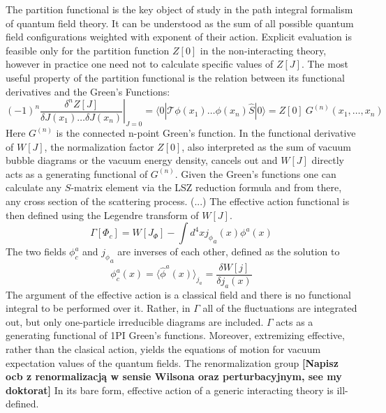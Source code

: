 \documentclass[11pt, a4paper]{article}
\newcommand{\jhk}[1]{{\color{red}#1}}
\newcommand{\jhkbf}[1]{\textbf{\color{red} [#1]}}
\begin{document}
The partition functional is the key object of study in the path integral formalism of quantum field theory.
It can be understood as the sum of all possible quantum field configurations weighted with exponent of their action.
Explicit evaluation is feasible only for the partition function $Z[0]$ in the non-interacting theory, however in practice one need not to calculate specific values of $Z[J]$. The most useful property of the partition functional is the relation between its functional derivatives and the Green's Functions:
\begin{equation}
(-1)^n \left.\frac{\delta^n Z[J]}{\delta J(x_1) \dots \delta J(x_n)}\right|_{J=0} =
\langle 0| \mathcal{T} \phi(x_1) \dots \phi(x_n) \hat{S} |0\rangle = 
    Z[0] \ G^{(n)}(x_1,\dots,x_n)
\end{equation}
Here $G^{(n)}$ is the connected n-point Green's function. In the functional derivative of $W[J]$, the normalization factor $Z[0]$, also interpreted as the sum of vacuum bubble diagrams or the vacuum energy density, cancels out and $W[J]$ directly acts as a generating functional of $G^{(n)}$.
Given the Green's functions one can calculate any $S$-matrix element via the LSZ reduction formula and from there, any cross section of the scattering process.
(...)
The effective action functional is then defined using the Legendre transform of $W[J]$.
\begin{equation}
    \Gamma[\Phi_c] = W[J_\Phi] - \int d^4 x {j_\phi}_a(x) \phi^a(x)
\end{equation}
The two fields $\phi^a_c$ and ${j_\phi}_a$ are inverses of each other, defined as the solution to
\begin{equation}
    \phi^a_c(x) = \langle \hat\phi^a (x) \rangle_{j_a} = \frac{\delta W[j]}{\delta j_a(x)}
\end{equation}
The argument of the effective action is a classical field and there is no functional integral to be performed over it.
Rather, in $\Gamma$ all of the fluctuations are integrated out, but only one-particle irreducible diagrams
are included. $\Gamma$ acts as a generating functional of 1PI Green's functions. Moreover, extremizing effective, rather than the clasical action, yields the equations of motion for vacuum expectation values of the quantum fields.
\jhk{The renormalization group}
\jhkbf{Napisz ocb z renormalizacją w sensie Wilsona oraz perturbacyjnym, see my doktorat}
In its bare form, effective action of a generic interacting theory is ill-defined. 
\end{document}

